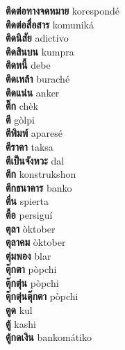 \textbf{ ติดต่อทางจดหมาย  } korespondé \\
\textbf{ ติดต่อสื่อสาร  } komuniká \\
\textbf{ ติดนิสัย  } adictivo \\
\textbf{ ติดสินบน  } kumpra \\
\textbf{ ติดหนี้  } debe \\
\textbf{ ติดเหล้า  } buraché \\
\textbf{ ติดแน่น  } anker \\
\textbf{ ติ๊ก  } chèk \\
\textbf{ ตี  } gòlpi \\
\textbf{ ตีพิมพ์  } aparesé \\
\textbf{ ตีราคา  } taksa \\
\textbf{ ตีเป็นจังหวะ  } dal \\
\textbf{ ตึก  } konstrukshon \\
\textbf{ ตึกธนาคาร  } banko \\
\textbf{ ตื่น  } spierta \\
\textbf{ ตื้อ  } persiguí \\
\textbf{ ตุลา  } òktober \\
\textbf{ ตุลาคม  } òktober \\
\textbf{ ตุ่มพอง  } blar \\
\textbf{ ตุ๊กตา  } pòpchi \\
\textbf{ ตุ๊กตุ่น  } pòpchi \\
\textbf{ ตุ๊กตุ่นตุ๊กตา  } pòpchi \\
\textbf{ ตูด  } kul \\
\textbf{ ตู้  } kashi \\
\textbf{ ตู้กดเงิน  } bankomátiko \\
